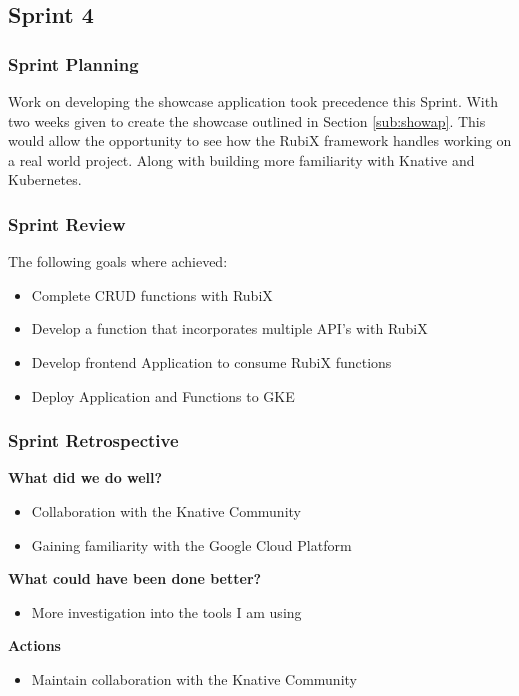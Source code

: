 \subsection{Sprint 4}
\subsubsection{Sprint Planning}
Work on developing the showcase application took precedence this Sprint. With two weeks given to create the showcase outlined in Section \ref{sub:showap}. This would allow the opportunity to see how the RubiX framework handles working on a real world project. Along with building more familiarity with Knative and Kubernetes.
\subsubsection{Sprint Review}
The following goals where achieved:
\begin{itemize}
    \item Complete CRUD functions with RubiX
    \item Develop a function that incorporates multiple API's with RubiX
    \item Develop frontend Application to consume RubiX functions
    \item Deploy Application and Functions to GKE
\end{itemize}
\subsubsection{Sprint Retrospective}
\textbf{What did we do well?}
\begin{itemize}
    \item Collaboration with the Knative Community
    \item Gaining familiarity with the Google Cloud Platform
\end{itemize}
\textbf{What could have been done better?}
\begin{itemize}
    \item More investigation into the tools I am using
\end{itemize}
\textbf{Actions}
\begin{itemize}
    \item Maintain collaboration with the Knative Community
\end{itemize}
